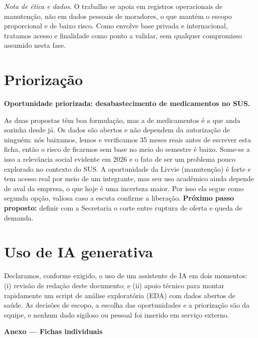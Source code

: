 \documentclass[11pt,a4paper]{article}
\begin{document}
\textit{Nota de ética e dados.} O trabalho se apoia em registros operacionais de manutenção, não em dados pessoais de moradores, o que mantém o escopo proporcional e de baixo risco. Como envolve base privada e internacional, tratamos acesso e finalidade como ponto a validar, sem qualquer compromisso assumido nesta fase.

\section{Priorização}

\textbf{Oportunidade priorizada: desabastecimento de medicamentos no SUS.}

As duas propostas têm boa formulação, mas a de medicamentos é a que anda sozinha desde já. Os dados são abertos e não dependem da autorização de ninguém: nós baixamos, lemos e verificamos 35 meses reais antes de escrever esta ficha, então o risco de ficarmos sem base no meio do semestre é baixo. Some-se a isso a relevância social evidente em 2026 e o fato de ser um problema pouco explorado no contexto do SUS. A oportunidade da Livvie (manutenção) é forte e tem acesso real por meio de um integrante, mas seu uso acadêmico ainda depende de aval da empresa, o que hoje é uma incerteza maior. Por isso ela segue como segunda opção, valiosa caso a escuta confirme a liberação. \textbf{Próximo passo proposto:} definir com a Secretaria o corte entre ruptura de oferta e queda de demanda.

\section*{Uso de IA generativa}

Declaramos, conforme exigido, o uso de um assistente de IA em dois momentos: (i) revisão de redação deste documento; e (ii) apoio técnico para montar rapidamente um script de análise exploratória (EDA) com dados abertos de saúde. As decisões de escopo, a escolha das oportunidades e a priorização são da equipe, e nenhum dado sigiloso ou pessoal foi inserido em serviço externo.\label{fimcorpo}

\newpage
\begin{center}
    {\large\bfseries\color{azulmls} Anexo --- Fichas individuais}
\end{center}
\end{document}
